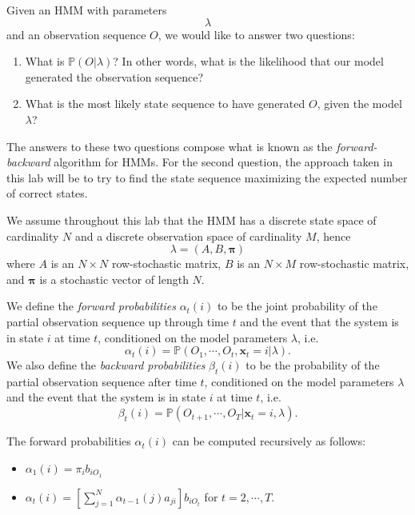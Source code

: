 

Given an HMM with parameters $$\lambda$$ and an observation sequence $O$, we would like to answer two questions:
\begin{enumerate}
 \item What is $\mathbb{P}(O | \lambda)$? In other words, what is the likelihood that our model generated the observation sequence?
 \item What is the most likely state sequence to have generated $O$, given the model $\lambda$?
\end{enumerate}

The answers to these two questions compose what is known as the \emph{forward-backward} algorithm for HMMs. For the second question, the approach taken in this lab will be to try to find the state sequence maximizing the expected number of correct states. 

We assume throughout this lab that the HMM has a discrete state space of cardinality $N$ and a discrete observation space of cardinality $M$, hence $$\lambda = \left( A, B, \mathbf{\pi} \right)$$ where $A$ is an $N \times N$ row-stochastic matrix, $B$ is an $N \times M$ row-stochastic matrix, and $\mathbf{\pi}$ is a stochastic vector of length $N$.

We define the \emph{forward probabilities} $\alpha_{t}(i)$ to be the joint probability of the partial observation sequence up through time $t$ and the event that the system is in state $i$ at time $t$, conditioned on the model parameters $\lambda$, i.e.
$$\alpha_{t}(i) = \mathbb{P}(O_{1},\cdots,O_{t},\mathbf{x}_{t} = i | \lambda).$$
We also define the \emph{backward probabilities} $\beta_{t}(i)$ to be the probability of the partial observation sequence after time $t$, conditioned on the model parameters $\lambda$ and the event that the system is in state $i$ at time $t$, i.e.
$$\beta_{t}(i) = \mathbb{P}(O_{t+1},\cdots,O_{T} | \mathbf{x}_{t} = i, \lambda).$$

The forward probabilities $\alpha_{t}(i)$ can be computed recursively as follows:
\begin{itemize}
 \item $\alpha_{1}(i) = \pi_{i}b_{iO_{1}}$
 \item $\alpha_{t}(i) = \left[ \sum_{j=1}^{N} \alpha_{t-1}(j)a_{ji}\right] b_{iO_{t}}$ for $t = 2,\cdots,T.$
\end{itemize}


